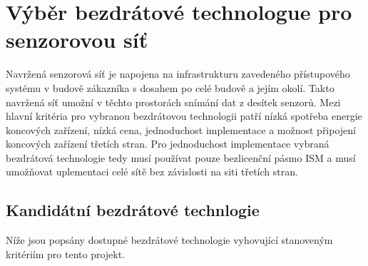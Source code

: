   \chapter{Výběr bezdrátové technologue pro senzorovou síť}
Navržená senzorová síť je napojena na infrastrukturu zavedeného přístupového systému v budově zákazníka s dosahem po celé budově a jejím okolí. Takto navržená síť umožní v těchto prostorách snímání dat z desítek senzorů.
Mezi hlavní kritéria pro vybranou bezdrátovou technologii patří nízká spotřeba energie koncových zařízení, nízká cena, jednoduchost implementace a možnost připojení koncových zařízení třetích stran.
Pro jednoduchost implementace vybraná bezdrátová technologie tedy musí používat pouze bezlicenční pásmo ISM a musí umožňovat uplementaci celé sítě bez závislosti na siti třetích stran. 


\section{Kandidátní bezdrátové technlogie}
Níže jsou popsány dostupné bezdrátové technologie vyhovující stanoveným kritériím pro tento projekt.

